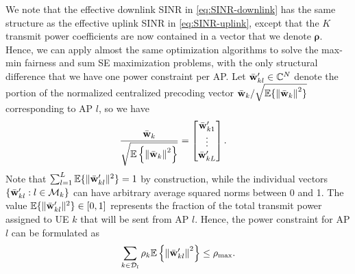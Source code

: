 We note that the effective downlink SINR in \eqref{eq:SINR-downlink} has the same structure as the effective uplink SINR in \eqref{eq:SINR-uplink}, except that the $K$ transmit power coefficients are now contained in a vector that we denote $\boldsymbol{\rho}$. Hence, we can apply almost the same optimization algorithms to solve the max-min fairness and sum SE maximization problems, with the only structural difference that we have one power constraint per AP. 
Let $\bar{\mathbf{w}}_{kl}^{\prime} \in \mathbb{C}^N$ denote the portion of the normalized centralized precoding vector $\bar{\mathbf{w}}_k /\sqrt{\mathbb{E} \{ \left\| \bar{\mathbf{w}}_k \right\|^2 \} }$ corresponding to AP $l$, so we have
\begin{align} \label{eq:normalized_centralized_precoding}
& \frac{\bar{\mathbf{w}}_k}{\sqrt{\mathbb{E} \left\{ \left\| \bar{\mathbf{w}}_k \right\|^2 \right\} }} = \begin{bmatrix} \bar{\mathbf{w}}_{k1}^{\prime} \\ \vdots \\  \bar{\mathbf{w}}_{kL}^{\prime} \end{bmatrix}.
\end{align}
Note that $\sum_{l=1}^{L} \mathbb{E} \{ \| \bar{\mathbf{w}}_{kl}^{\prime} \|^2 \} = 1$ by construction, while the individual vectors $\{\bar{\mathbf{w}}_{kl}^{\prime}: l\in \mathcal{M}_k\}$ can have arbitrary average squared norms between 0 and 1. The value $\mathbb{E} \{ \| \bar{\mathbf{w}}_{kl}^{\prime} \|^2 \} \in [0,1]$ represents the fraction of the total transmit power assigned to UE $k$ that will be sent from AP $l$. Hence, the power constraint for AP $l$ can be formulated as
\begin{equation} \label{eq:power-constraint-centralized}
\sum_{k\in \mathcal{D}_l}\rho_k\mathbb{E} \left\{ \left\| \bar{\mathbf{w}}_{kl}^{\prime} \right\|^2 \right\} \leq \rho_{\textrm{max}}.
\end{equation}

